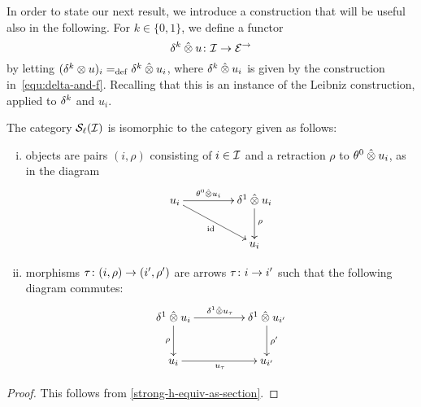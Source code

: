\documentclass[reqno,10pt,a4paper,oneside]{amsart}
\begin{document}
\medskip

In order to state our next result, we introduce a construction that will be useful also in the following. For  $k \in \{ 0, 1 \}$, we define a functor
 \[
\kcyl \hatotimes u \co \cal{I} \to \catE^\to
 \]
 by letting $(\kcyl \otimes u)_i \defeq \kcyl  \hatotimes u_i$,  where $\kcyl \hatotimes u_i$ is given by the construction
 in~\eqref{equ:delta-and-f}. Recalling that this is an instance of the Leibniz construction, applied to $\kcyl$ and $u_i$.  
 
 



\begin{lemma}
\label{strong-h-equiv-as-section-algebraic}
The category $\cal{S}_\ell(\cal{I})$ is  isomorphic to the category given as follows:
\begin{enumerate}[(i)]
\item  objects are pairs $(i, \rho)$ consisting of $i \in \cal{I}$ and a retraction $\rho$ to $\thetal \hatotimes u_i$, as in the diagram
\[
\xymatrix@C+2em{
u_i 
  \ar[r]^-{\thetal \hatotimes u_i }
  \ar[dr]_{\id}
&
  \rcyl \hatotimes u_i \ar[d]^{\rho}
\\&
  u_i
}
\]
\item morphisms $\tau \co (i, \rho) \to (i', \rho')$ are arrows $\tau \co i \to i'$  such that the following
diagram commutes:
\[
\xymatrix@C+2em{
  \rcyl \hatotimes u_i 
  \ar[d]_-{\rho}
  \ar[r]^{\rcyl \hatotimes u_\tau }
&
 \rcyl \hatotimes u_{i'} 
  \ar[d]^-{\rho'}
\\
  u_i
  \ar[r]_{u_\tau}
&
  u_{i'}
}
\]
\end{enumerate}
\end{lemma}

\begin{proof} This follows from \cref{strong-h-equiv-as-section}.
\end{proof}
\end{document}
